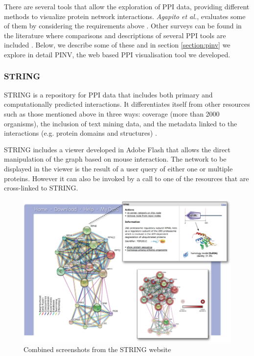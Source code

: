 There are several tools that allow the exploration of PPI data, providing different methods to visualize protein network interactions. \emph{Agapito et al.}, evaluates some of them by considering the requirements above \cite{AGA2013}. Other surveys can be found in the literature where comparisons and descriptions of several PPI tools are included \cite{SUD2007, PAV2008, GEH2010}. Below, we describe some of these and in section \ref{section:pinv} we explore in detail PINV, the web based PPI visualisation tool we developed. 

\subsubsection{STRING}
STRING is a repository for PPI data that includes both primary and computationally predicted interactions. It differentiates itself from other resources such as those mentioned above in three ways: coverage (more than 2000 organisms), the inclusion of text mining data, and the metadata linked to the interactions (e.g. protein domains and structures) \cite{FRA2013}.

STRING includes a viewer developed in Adobe Flash that allows the direct manipulation of the graph based on mouse interaction. The network to be displayed in the viewer is the result of a user query of either one or multiple proteins. However it can also be invoked by a call to one of the resources that are cross-linked to STRING.

\begin{figure}  
\centering
\includegraphics[width=\textwidth]{figures/string.png}
\caption[STRING Snapshot.]{Combined screenshots from the STRING website
\label{fig:string}}
\end{figure}

